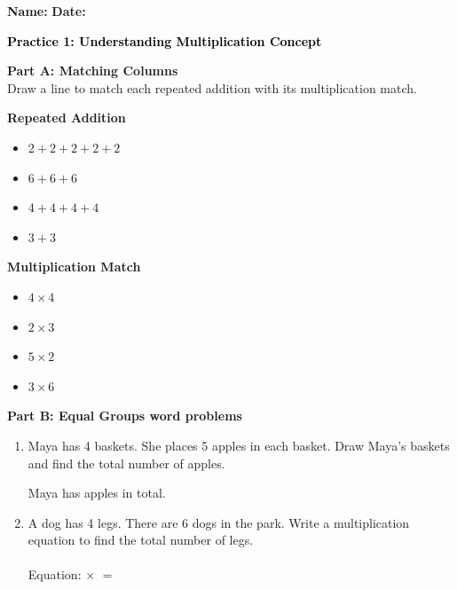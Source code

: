 \documentclass[12pt, letterpaper, fleqn]{article}
\newcommand{\blank}{\underline{\hspace{2.2cm}}}
\begin{document}
\textbf{Name:} \underline{\hspace{5cm}}
\hfill
\textbf{Date:} \underline{\hspace{3cm}}\\

\begin{tcolorbox}[colback=customteal!20]
    \large\textcolor{black}{\textbf{Practice 1: Understanding Multiplication Concept}}
\end{tcolorbox}

\vspace{5mm}
\noindent
\textbf{Part A: Matching Columns} \\
Draw a line to match each repeated addition with its multiplication match.

\vspace{5mm}
\begin{minipage}{0.45\textwidth}
\textbf{Repeated Addition}
\begin{itemize}[label=$\bullet$, itemsep=1.2cm]
    \item $2 + 2 + 2 + 2 + 2$
    \item $6 + 6 + 6$
    \item $4 + 4 + 4 + 4$
    \item $3 + 3$
\end{itemize}
\end{minipage}
\begin{minipage}{0.45\textwidth}
\textbf{Multiplication Match}
\begin{itemize}[label=$\bullet$, itemsep=1.2cm]
    \item $4 \times 4$
    \item $2 \times 3$
    \item $5 \times 2$
    \item $3 \times 6$
\end{itemize}
\end{minipage}

\newpage
\begin{tcolorbox}[colback=customteal!10]
\textbf{Part B: Equal Groups word problems}
\end{tcolorbox}

\vspace{5mm}
\begin{enumerate}[itemsep=2.5cm, leftmargin=0.6cm]
\item Maya has 4 baskets. She places 5 apples in each basket. Draw Maya's baskets and find the total number of apples.

\vspace{4cm}
Maya has \blank apples in total.

\item A dog has 4 legs. There are 6 dogs in the park. Write a multiplication equation to find the total number of legs.
\\ \\
Equation: \blank $\times$ \blank $=$ \blank
\end{enumerate}
\end{document}
